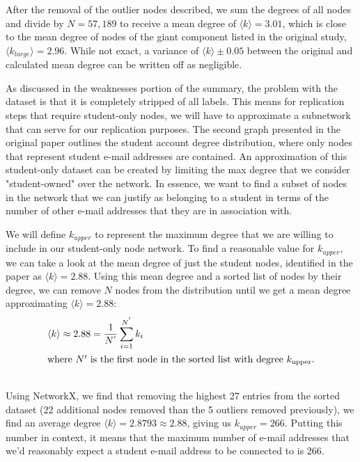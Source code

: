 \documentclass[11pt]{article}
\begin{document}
\begin{multicols}{2}
After the removal of the outlier nodes described, we sum the degrees of all nodes and divide by \(N = 57,189\) to receive a mean degree of \(\langle k \rangle=3.01\), which is close to the mean degree of nodes of the giant component listed in the original study, \(\langle k_{large} \rangle = 2.96\). While not exact, a variance of \(\langle k \rangle \pm 0.05\)  between the original and calculated mean degree can be written off as negligible. 

As discussed in the weaknesses portion of the summary, the problem with the dataset is that it is completely stripped of all labels. This means for replication steps that require student-only nodes, we will have to approximate a subnetwork that can serve for our replication purposes. The second graph presented in the original paper outlines the student account degree distribution, where only nodes that represent student e-mail addresses are contained. An approximation of this student-only dataset can be created by limiting the max degree that we consider "student-owned" over the network. In essence, we want to find a subset of nodes in the network that we can justify as belonging to a student in terms of the number of other e-mail addresses that they are in association with. 

We will define \(k_{upper}\) to represent the maximum degree that we are willing to include in our student-only node network. To find a reasonable value for \(k_{upper}\), we can take a look at the mean degree of just the student nodes, identified in the paper as \(\langle k \rangle =2.88\). Using this mean degree and a sorted list of nodes by their degree, we can remove \(N\) nodes from the distribution until we get a mean degree approximating \(\langle k \rangle =2.88\):
\begin{align}
\langle k \rangle \approx 2.88 = \frac{1}{N^{'}} \sum_{i=1}^{N^{'}} k_i \\
\intertext{where $N'$ is the first node in the sorted list with degree $k_{\text{upper}}$.}\notag 
\end{align} 
\hspace*{\parindent}Using NetworkX, we find that removing the highest 27 entries from the sorted dataset (22 additional nodes removed than the 5 outliers removed previously), we find an average degree \(\langle k \rangle = 2.8793 \approx 2.88\), giving us \(k_{upper} = 266\). Putting this number in context, it means that the maximum number of e-mail addresses that we'd reasonably expect a student e-mail address to be connected to is 266. 


\end{multicols}
\end{document}

